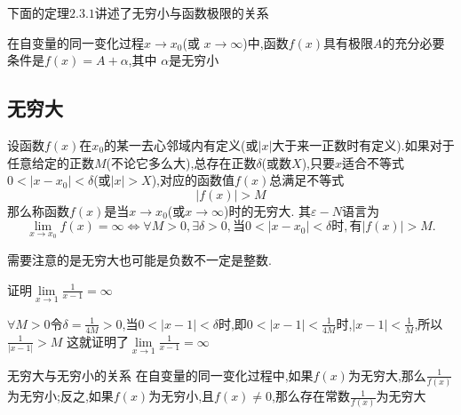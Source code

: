 \documentclass[12pt, a4paper, oneside, UTF8]{ctexbook}  %
\begin{document}
\begin{sloppypar}
    下面的定理$2.3.1$讲述了无穷小与函数极限的关系
    \begin{them}{}{}
        在自变量的同一变化过程$x\to x_0$(或 $x\to\infty$)中,函数$f(x)$具有极限$A$的充分必要条件是$f(x)=A+\alpha$,其中 $\alpha$是无穷小
    \end{them}

    \subsection{无穷大}
    \begin{defn}{}{}
        设函数$f(x)$在$x_0$的某一去心邻域内有定义(或$|x|$大于来一正数时有定义).如果对于任意给定的正数$M$(不论它多么大),总存在正数$\delta$(或数$X$),只要$x$适合不等式$0<|x-x_0|<\delta$(或$|x|>X$),对应的函数值$f(x)$总满足不等式
        $$
            |f(x)|>M
        $$
        那么称函数$f(x)$是当$x\to x_0$(或$x\to\infty$)时的无穷大.
        其$\varepsilon-N$语言为
        $$
            \lim\limits_{x\to x_0}f(x)= \infty \Leftrightarrow\forall M >0,\exists\delta>0,\text{当}0<|x-x_0|<\delta\text{时},\text{有}|f(x)|>M.
        $$
    \end{defn}
    需要注意的是无穷大也可能是负数不一定是整数.
    \begin{problem}
    证明$\underset{x\rightarrow1}{\operatorname*{lim}}\frac{1}{x-1}=\infty $
    \end{problem}
    \begin{solution}
        $\forall M>0$令$\delta=\frac{1}{4M}>0$,当$0<|x-1|<\delta$时,即$0<|x-1|<\frac{1}{4M}$时,$|x-1|<\frac{1}{M}$,所以$\frac{1}{|x-1|}>M$
        这就证明了$\underset{x\rightarrow1}{\operatorname*{lim}}\frac{1}{x-1}=\infty$
    \end{solution}
    \begin{them}{无穷大与无穷小的关系}{}
        在自变量的同一变化过程中,如果$f(x)$为无穷大,那么$\frac{1}{f(x)}$为无穷小;反之,如果$f(x)$为无穷小,且$f(x) \neq 0$,那么存在常数$\frac{1}{f(x)}为无穷大$
    \end{them}


\end{sloppypar}
\end{document}
